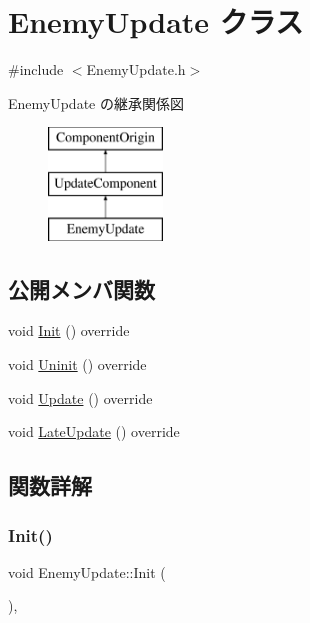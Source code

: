 \hypertarget{class_enemy_update}{}\section{Enemy\+Update クラス}
\label{class_enemy_update}


{\ttfamily \#include $<$Enemy\+Update.\+h$>$}

Enemy\+Update の継承関係図\begin{figure}[H]
\begin{center}
\leavevmode
\includegraphics[height=3.000000cm]{class_enemy_update}
\end{center}
\end{figure}
\subsection*{公開メンバ関数}
\begin{DoxyCompactItemize}
\item 
void \mbox{\hyperlink{class_enemy_update_a5b68696e964f71fca73c9143e3770c9d}{Init}} () override
\item 
void \mbox{\hyperlink{class_enemy_update_a294a5d4c65551af43e933cb65036f279}{Uninit}} () override
\item 
void \mbox{\hyperlink{class_enemy_update_ae9662f3a2d064dc69c0d68293e60f051}{Update}} () override
\item 
void \mbox{\hyperlink{class_enemy_update_ae14e4ebb42ad9043534e53edcba5b242}{Late\+Update}} () override
\end{DoxyCompactItemize}


\subsection{関数詳解}
\mbox{\label{class_enemy_update_a5b68696e964f71fca73c9143e3770c9d}} 
\subsubsection{\texorpdfstring{Init()}{Init()}}
{\footnotesize\ttfamily void Enemy\+Update\+::\+Init (\begin{DoxyParamCaption}{ }\end{DoxyParamCaption})\hspace{0.3cm}{\ttfamily [override]}, {\ttfamily [virtual]}}



